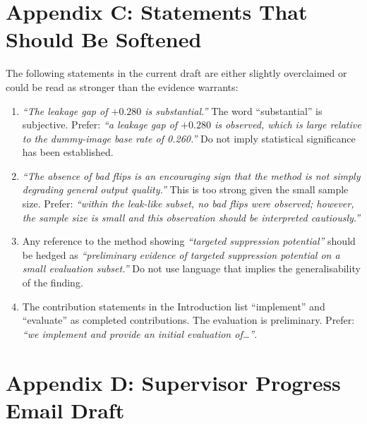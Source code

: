 \documentclass[12pt, a4paper]{article}
\begin{document}
\section*{Appendix C: Statements That Should Be Softened}
\label{app:softening}

The following statements in the current draft are either slightly overclaimed or
could be read as stronger than the evidence warrants:

\begin{enumerate}[leftmargin=*, itemsep=3pt]
  \item \emph{``The leakage gap of $+0.280$ is substantial.''} The word
    ``substantial'' is subjective. Prefer: \emph{``a leakage gap of $+0.280$ is
    observed, which is large relative to the dummy-image base rate of 0.260.''} Do not
    imply statistical significance has been established.
  \item \emph{``The absence of bad flips is an encouraging sign that the method is
    not simply degrading general output quality.''} This is too strong given the
    small sample size. Prefer: \emph{``within the leak-like subset, no bad flips
    were observed; however, the sample size is small and this observation should
    be interpreted cautiously.''}
  \item Any reference to the method showing \emph{``targeted suppression potential''}
    should be hedged as \emph{``preliminary evidence of targeted suppression potential
    on a small evaluation subset.''} Do not use language that implies the
    generalisability of the finding.
  \item The contribution statements in the Introduction list ``implement'' and
    ``evaluate'' as completed contributions. The evaluation is preliminary.
    Prefer: \emph{``we implement and provide an initial evaluation of\ldots''}.
\end{enumerate}


\section*{Appendix D: Supervisor Progress Email Draft}
\label{app:email}
\end{document}
